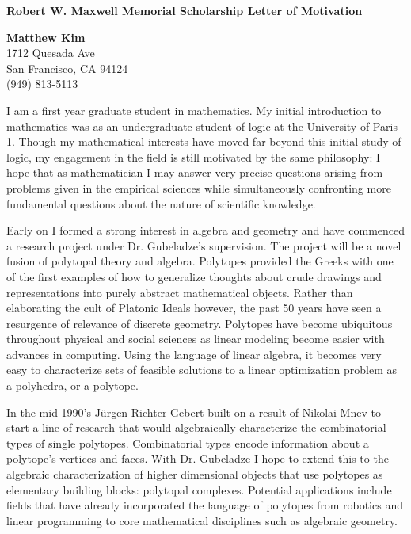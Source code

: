 \documentclass[11pt]{letter} %
\begin{document}
\signature{Matthew Cadier Kim}
\setlength\parindent{24pt}                  %
 
\begin{letter}{\bf Robert W. Maxwell Memorial Scholarship Letter of Motivation} 

\begin{center}
\large{\bf Matthew Kim}\\
1712 Quesada Ave\\ San Francisco, CA 94124\\ (949) 813-5113
\end{center} 
\vfill %

\opening{} 



\quad \quad I am a first year graduate student in mathematics. My initial introduction to mathematics was as an undergraduate student of logic at the University of Paris 1.  Though  my mathematical interests have moved far beyond this initial study of logic, my engagement in the field is still motivated by the same philosophy: I hope that as mathematician I may answer very precise questions arising from problems given in the empirical sciences while simultaneously confronting more fundamental questions about the nature of scientific knowledge.
 
Early on I formed a strong interest in algebra and geometry and have commenced a research project under Dr. Gubeladze's supervision. The project will be a novel fusion of polytopal theory and algebra.  Polytopes provided the Greeks with one of the first examples of how to generalize thoughts about crude drawings and representations into purely abstract mathematical objects.  Rather than elaborating the cult of Platonic Ideals however, the past 50 years have seen a resurgence of relevance of discrete geometry. Polytopes have become ubiquitous throughout physical and social sciences as linear modeling become easier with advances in computing.  Using the language of linear algebra, it becomes very easy to characterize sets of feasible solutions to a linear optimization problem as a polyhedra, or a polytope. 

In the mid 1990's J\"urgen Richter-Gebert built on a result of Nikolai Mnev to start a line of research that would algebraically characterize the combinatorial types of single polytopes.  Combinatorial types encode information about a polytope's vertices and faces.  With Dr. Gubeladze I hope to extend this to the algebraic characterization of higher dimensional objects that use polytopes as elementary building blocks: polytopal complexes. Potential applications include fields that have already incorporated the language of polytopes from robotics and linear programming to core mathematical disciplines such as 
algebraic geometry. 


\end{letter}
\end{document}
